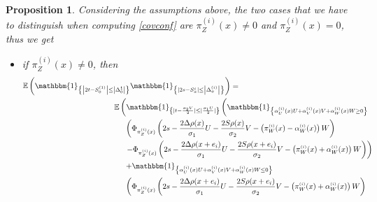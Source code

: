 \documentclass[12pt]{article}
\theoremstyle{Theorem}
\newtheorem{Proposition}[Theorem]{Proposition}
\begin{document}
\begin{Proposition}
\label{PropositionFourCell}
Considering the assumptions above, the two cases that we have to distinguish when computing \eqref{covconf} are $\pi^{\scriptscriptstyle(i)}_{Z}(x) \neq 0$ and $\pi^{\scriptscriptstyle(i)}_{Z}(x) = 0$, thus we get 
\begin{itemize}
  \item if $\pi^{\scriptscriptstyle(i)}_{Z}(x) \neq 0$, then 
  {\small 
\begin{align}
\label{Thisthofour}
\mathbb{E}\left(\mathbbm{1}_{\left\{ \left|2t - S^{\scriptscriptstyle (1)}_{\scriptscriptstyle 0}\right| \leq \left|\Delta^{\scriptscriptstyle 1}_{\scriptscriptstyle 0}\right|\right\}}\mathbbm{1}_{\left\{ \left|2s - S^{\scriptscriptstyle i}_{\scriptscriptstyle x}\right| \leq \left|\Delta^{\scriptscriptstyle (i)}_x\right| \right\}}\right) & = \nonumber \\
& \hspace{-5.4cm} \mathbb{E}\left(\mathbbm{1}_{\left\{ |t - \frac{\sigma_2V}{2}| \leq |\frac{\sigma_1U}{2}|\right\}} \left( \mathbbm{1}_{\left\{ \alpha^{\scriptscriptstyle(i)}_{U}(x)U +  \alpha^{\scriptscriptstyle(i)}_{V}(x) V +  \alpha^{\scriptscriptstyle(i)}_{W}(x) W \geq 0\right\}} \right. \right. \nonumber \\
& \hspace{-5cm}\left. \left. \left(\Phi_{ \pi^{\scriptscriptstyle(i)}_{Z}(x)}\left( 2s - \frac{2\Delta \rho(x) }{\sigma_1} U - \frac{2S\rho(x)}{\sigma_{2}}V - \left( \pi^{\scriptscriptstyle(i)}_{W}(x) -  \alpha^{\scriptscriptstyle(i)}_{W}(x)\right) W \right)  \right. \right. \right. \nonumber \\
& \hspace{-5cm}\left. \left. \left. - \Phi_{ \pi^{\scriptscriptstyle(i)}_{Z}(x)}\left( 2s - \frac{2\Delta \rho(x+e_i) }{\sigma_1}U - \frac{2S \rho(x+e_i) }{\sigma_{2}}V - \left( \pi^{\scriptscriptstyle(i)}_{W}(x) +  \alpha^{\scriptscriptstyle(i)}_{W}(x) \right)W \right)  \right) \right. \right. \nonumber \\
&  \hspace{-5cm} \left. \left. + \mathbbm{1}_{\left\{ \alpha^{\scriptscriptstyle(i)}_{U}(x)U +  \alpha^{\scriptscriptstyle(i)}_{V}(x) V +  \alpha^{\scriptscriptstyle(i)}_{W}(x) W \leq 0\right\}} \right. \right. \nonumber\\
& \left. \left. \hspace{-5cm}\left(\Phi_{ \pi^{\scriptscriptstyle(i)}_{Z}(x)}\left( 2s - \frac{2\Delta \rho(x+e_i) }{\sigma_1}U - \frac{2S \rho(x+e_i) }{\sigma_{2}}V - \left( \pi^{\scriptscriptstyle(i)}_{W}(x) +  \alpha^{\scriptscriptstyle(i)}_{W}(x) \right)W   \right)  \right. \right. \right. \nonumber \\

\end{align}}
\end{itemize}
\end{Proposition}
\end{document}
